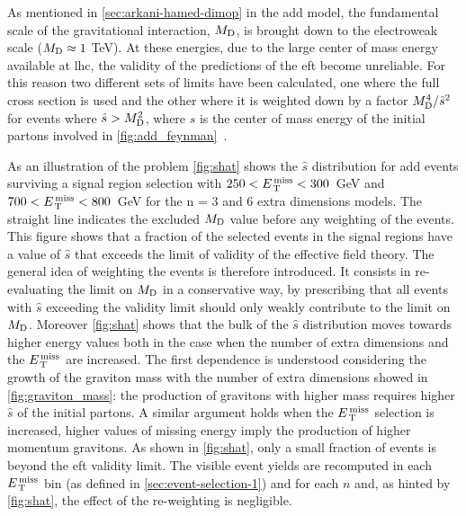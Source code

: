 As mentioned in \cref{sec:arkani-hamed-dimop} in the \gls{add} model, the
fundamental scale of the gravitational interaction, $M_\mathrm{D}$, is brought down to
the electroweak scale ($M_\mathrm{D} \approx 1~$TeV). At these energies, due to the large
center of mass energy available at \gls{lhc}, the validity of the predictions of
the \gls{eft} become unreliable. For this reason two different sets of limits
have been calculated, one where the full cross section is used and the other
where it is weighted down by a factor $M_\mathrm{D}^4/\hat{s}^2$ for events where
$\hat{s} > M_\mathrm{D}^2$, where $\hat{s}$ is the center of mass energy of the initial
partons involved in \cref{fig:add_feynman}~\cite{LEDWeightFactor}.

As an illustration of the problem \cref{fig:shat} shows the $\hat{s}$
distribution for \gls{add} events surviving a signal region selection with
$250 < E_\mathrm{\, T}^\mathrm{\, miss} < 300$~GeV and $700 < E_\mathrm{\, T}^\mathrm{\, miss} < 800$~GeV for the n = 3 and 6 extra
dimensions models. The straight line indicates the excluded $M_\mathrm{D}$ value before
any weighting of the events. This figure shows that a fraction of the selected
events in the signal regions have a value of $\hat{s}$ that exceeds the limit of
validity of the effective field theory. The general idea of weighting the events
is therefore introduced. It consists in re-evaluating the limit on $M_\mathrm{D}$ in a
conservative way, by prescribing that all events with $\hat{s}$ exceeding the
validity limit should only weakly contribute to the limit on $M_\mathrm{D}$. Moreover
\cref{fig:shat} shows that the bulk of the $\hat{s}$ distribution moves towards
higher energy values both in the case when the number of extra dimensions and
the $E_\mathrm{\, T}^\mathrm{\, miss}$ are increased. The first dependence is understood considering the
growth of the graviton mass with the number of extra dimensions showed in
\cref{fig:graviton_mass}: the production of gravitons with higher mass requires
higher $\hat{s}$ of the initial partons. A similar argument holds when the
$E_\mathrm{\, T}^\mathrm{\, miss}$ selection is increased, higher values of missing energy imply the
production of higher momentum gravitons. As shown in \cref{fig:shat}, only a
small fraction of events is beyond the \gls{eft} validity limit. The visible
event yields are recomputed in each $E_\mathrm{\, T}^\mathrm{\, miss}$ bin (as defined in
\cref{sec:event-selection-1}) and for each $n$ and, as hinted by
\cref{fig:shat}, the effect of the re-weighting is negligible.
